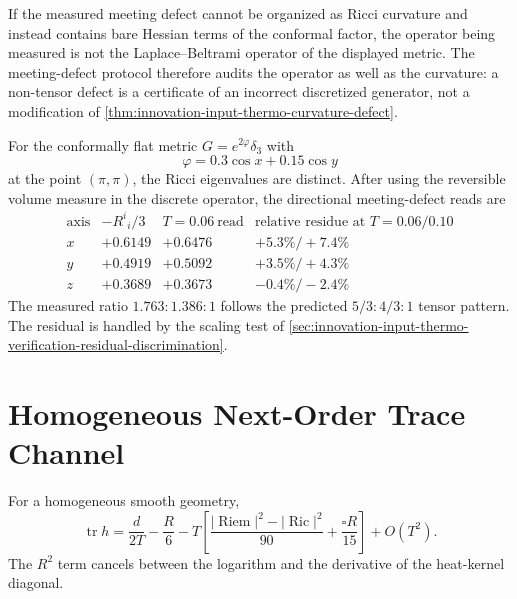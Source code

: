 \begin{principle}
\label{prin:innovation-input-thermo-non-tensor-audit}
If the measured meeting defect cannot be organized as Ricci curvature and
instead contains bare Hessian terms of the conformal factor, the operator
being measured is not the Laplace--Beltrami operator of the displayed
metric. The meeting-defect protocol therefore audits the operator as well
as the curvature: a non-tensor defect is a certificate of an incorrect
discretized generator, not a modification of
\autoref{thm:innovation-input-thermo-curvature-defect}.
\end{principle}

\begin{principle}
\label{prin:innovation-input-thermo-three-dimensional-tensor-witness}
For the conformally flat metric $G=e^{2\varphi}\delta_3$ with
$$
\varphi=0.3\cos x+0.15\cos y
$$
at the point $(\pi,\pi)$, the Ricci eigenvalues are distinct. After using
the reversible volume measure in the discrete operator, the directional
meeting-defect reads are
$$
\begin{array}{c|c|c|c}
\text{axis} & -R^i{}_i/3 & T=0.06\ \text{read}
& \text{relative residue at }T=0.06/0.10\\
\hline
x & +0.6149 & +0.6476 & +5.3\%/+7.4\%\\
y & +0.4919 & +0.5092 & +3.5\%/+4.3\%\\
z & +0.3689 & +0.3673 & -0.4\%/-2.4\%
\end{array}
$$
The measured ratio $1.763:1.386:1$ follows the predicted
$5/3:4/3:1$ tensor pattern. The residual is handled by the scaling test of
\autoref{sec:innovation-input-thermo-verification-residual-discrimination}.
\end{principle}

\section{Homogeneous Next-Order Trace Channel}
\label{sec:innovation-input-thermo-verification-next-order-trace}

\begin{theorem}
\label{thm:innovation-input-thermo-homogeneous-trace-expansion}
For a homogeneous smooth geometry,
$$
\operatorname{tr}h
=
\frac{d}{2T}
-
\frac{R}{6}
-
T
\left[
\frac{|\operatorname{Riem}|^2-|\operatorname{Ric}|^2}{90}
+
\frac{\square R}{15}
\right]
+
O(T^2).
$$
The $R^2$ term cancels between the logarithm and the derivative of the
heat-kernel diagonal.
\end{theorem}

